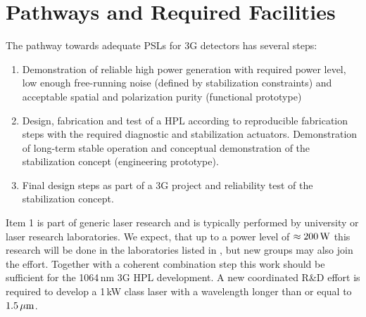 %


\section{Pathways and Required Facilities} \label{sec:pathway}
The pathway towards adequate PSLs for 3G detectors has several steps:
\begin{enumerate}
	\item Demonstration of reliable high power generation with required power level, low enough free-running noise (defined by stabilization constraints) and acceptable spatial and polarization purity (functional prototype)
	\item Design, fabrication and test of a HPL according to reproducible fabrication steps with the required diagnostic and stabilization actuators. Demonstration of long-term stable operation and conceptual demonstration of the stabilization concept (engineering prototype).
	\item Final design steps as part of a 3G project and reliability test of the stabilization concept.
\end{enumerate}

\noindent Item 1 is part of generic laser research and is typically performed by university or laser research laboratories. We expect, that up to a power level of $ \approx 200 \, {\rm W} $ this research will be done in the laboratories listed in \cite{LightSource_RD_table}, but new groups may also join the effort. Together with a coherent combination step this work should be sufficient for the 1064\,nm 3G HPL development.
A new coordinated R\&D effort is required to develop a 1\,kW class laser with a wavelength longer than or equal to $ 1.5\, {\rm \mu m}$.

